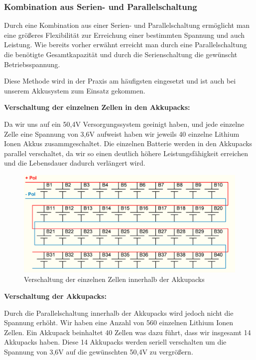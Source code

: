 \subsubsection{Kombination aus Serien- und Parallelschaltung}
Durch eine Kombination aus einer Serien- und Parallelschaltung ermöglicht man eine größeres Flexibilität zur Erreichung einer bestimmten Spannung und auch Leistung. Wie bereits vorher erwähnt erreicht man durch eine Parallelschaltung die benötigte Gesamtkapazität und durch die Serienschaltung die gewünscht Betriebsspannung.

Diese Methode wird in der Praxis am häufigsten eingesetzt und ist auch bei unserem Akkusystem zum Einsatz gekommen.

\textbf{Verschaltung der einzelnen Zellen in den Akkupacks:}

Da wir uns auf ein 50,4V Versorgungssystem geeinigt haben, und jede einzelne Zelle eine Spannung von 3,6V aufweist haben wir jeweils 40 einzelne Lithium Ionen Akkus zusammgeschaltet. Die einzelnen Batterie werden in den Akkupacks parallel verschaltet, da wir so einen deutlich höhere Leistungsfähigkeit erreichen und die Lebensdauer dadurch verlängert wird. 

\begin{figure}[H]
	\begin{center}
		\includegraphics[scale=0.6]{figures/Akku/Anschlussplan 40Zellen.PNG}
		\caption{Verschaltung der einzelnen Zellen innerhalb der Akkupacks}
	\end{center}
\end{figure}
\newpage

\textbf{Verschaltung der Akkupacks:}

Durch die Parallelschaltung innerhalb der Akkupacks wird jedoch nicht die Spannung erhöht. Wir haben eine Anzahl von 560 einzelnen Lithium Ionen Zellen. Ein Akkupack beinhaltet 40 Zellen was dazu führt, dass wir insgesamt 14 Akkupacks haben. Diese 14 Akkupacks werden seriell verschalten um die Spannung von 3,6V auf die gewünschten 50,4V zu vergrößern.

